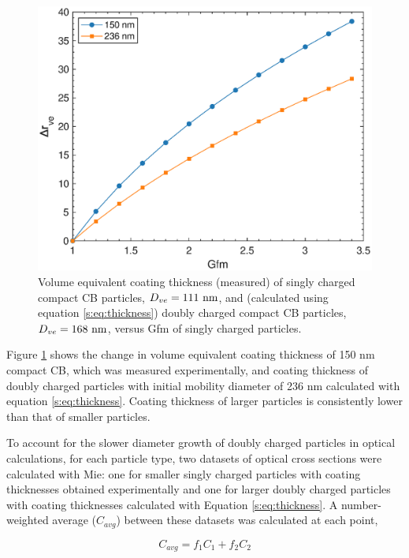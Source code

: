 \documentclass[12pt]{article}
\begin{document}
\begin{figure}[htp]
\centering
\includegraphics[scale=0.7]{images/fig_supp_thickness_formula.eps}
\caption{Volume equivalent coating thickness (measured) of singly charged compact CB particles, $D_{ve}=111\ \rm nm$, and (calculated using equation \ref{s:eq:thickness}) doubly charged compact CB particles, $D_{ve}=168\ \rm nm$, versus Gfm of singly charged particles.}
\label{s:fig:thickness}
\end{figure}

Figure \ref{s:fig:thickness} shows the change in volume equivalent coating thickness of 150 nm compact CB, which was measured experimentally, and coating thickness of doubly charged particles with initial mobility diameter of 236 nm calculated with equation \ref{s:eq:thickness}. Coating thickness of larger particles is consistently lower than that of smaller particles.

To account for the slower diameter growth of doubly charged particles in optical calculations, for each particle type, two datasets of optical cross sections were calculated with Mie: one for smaller singly charged particles with coating thicknesses obtained experimentally and one for larger doubly charged particles with coating thicknesses calculated with Equation \ref{s:eq:thickness}. A number-weighted average ($C_{avg}$) between these datasets was calculated at each point,

\begin{equation}
    C_{avg}=f_1C_1+f_2C_2
\end{equation}
\end{document}

